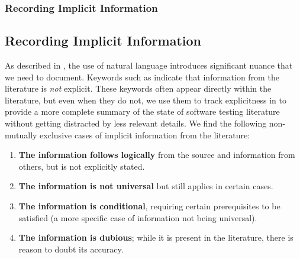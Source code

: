 \ifnotpaper\subsubsection{Recording Implicit Information}
\else\subsection{Recording Implicit Information}
\fi\label{imp-info}

As described in , the use of natural language introduces
significant nuance that we need to document. Keywords such as \impKeywords{}
indicate that information from the literature is \emph{not} explicit. These
keywords often appear directly within the literature, but even when they do
not, we use them to track explicitness in \ourApproachGlossary{} to
provide a more complete summary of the state of software testing literature
without getting distracted by less relevant details. We find the following
non-mutually exclusive cases of implicit information from the literature:

\begin{enumerate}
    \item \textbf{The information follows logically} from the source and
          information from others, but is not explicitly stated.
    \item \textbf{The information is not universal} but still applies in
          certain cases. \ifnotpaper
    \item \textbf{The information is conditional}, requiring certain
          prerequisites to be satisfied (a more specific case of information
          not being universal). \fi
    \item \textbf{The information is dubious}; while it is present in the
          literature, there is reason to doubt its accuracy.
\end{enumerate}


